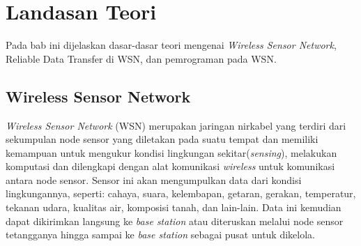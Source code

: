 \chapter{Landasan Teori}
\label{chap:teori}
Pada bab ini dijelaskan dasar-dasar teori mengenai \textit{Wireless Sensor Network}, Reliable Data Transfer di WSN, dan pemrograman pada WSN.

\section{Wireless Sensor Network}
\label{sec:wsn}
\textit{Wireless Sensor Network} (WSN) merupakan jaringan nirkabel yang terdiri dari sekumpulan node sensor yang diletakan pada suatu tempat dan memiliki kemampuan untuk mengukur kondisi lingkungan sekitar(\textit{sensing}), melakukan komputasi dan dilengkapi dengan alat komunikasi \textit{wireless} untuk komunikasi antara node sensor. Sensor ini akan mengumpulkan data dari kondisi lingkungannya, seperti: cahaya, suara, kelembapan, getaran, gerakan, temperatur, tekanan udara, kualitas air, komposisi tanah, dan lain-lain. Data ini kemudian dapat dikirimkan langsung ke \textit{base station} atau diteruskan melalui node sensor tetangganya hingga sampai ke \textit{base station} sebagai pusat untuk dikelola.

